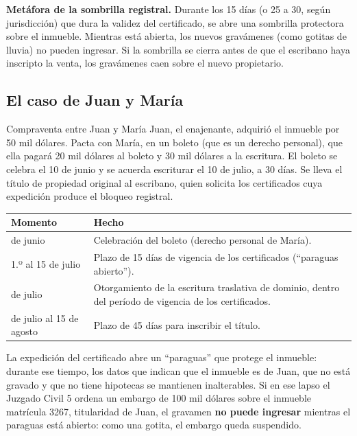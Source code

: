 \documentclass[12pt,oneside]{book}
\begin{document}
\begin{note}
\textbf{Metáfora de la sombrilla registral.} Durante los 15 días (o 25 a 30, según jurisdicción) que dura la validez del certificado, se abre una sombrilla protectora sobre el inmueble. Mientras está abierta, los nuevos gravámenes (como gotitas de lluvia) no pueden ingresar. Si la sombrilla se cierra antes de que el escribano haya inscripto la venta, los gravámenes caen sobre el nuevo propietario.
\end{note}

\subsection{El caso de Juan y María}

\begin{example}{Compraventa entre Juan y María}
Juan, el enajenante, adquirió el inmueble por 50 mil dólares. Pacta con María, en un boleto (que es un derecho personal), que ella pagará 20 mil dólares al boleto y 30 mil dólares a la escritura. El boleto se celebra el 10 de junio y se acuerda escriturar el 10 de julio, a 30 días. Se lleva el título de propiedad original al escribano, quien solicita los certificados cuya expedición produce el bloqueo registral.
\end{example}

\begin{table}[H]
\centering
\begin{tabularx}{\textwidth}{@{}>{\raggedright\arraybackslash}p{}>{\raggedright\arraybackslash}X@{}}
\toprule
\textbf{Momento} & \textbf{Hecho} \\
\midrule
10 de junio & Celebración del boleto (derecho personal de María). \\
1.º al 15 de julio & Plazo de 15 días de vigencia de los certificados (``paraguas abierto''). \\
10 de julio & Otorgamiento de la escritura traslativa de dominio, dentro del período de vigencia de los certificados. \\
10 de julio al 15 de agosto & Plazo de 45 días para inscribir el título. \\
\bottomrule
\end{tabularx}
\end{table}

La expedición del certificado abre un ``paraguas'' que protege el inmueble: durante ese tiempo, los datos que indican que el inmueble es de Juan, que no está gravado y que no tiene hipotecas se mantienen inalterables. Si en ese lapso el Juzgado Civil 5 ordena un embargo de 100 mil dólares sobre el inmueble matrícula 3267, titularidad de Juan, el gravamen \textbf{no puede ingresar} mientras el paraguas está abierto: como una gotita, el embargo queda suspendido.
\end{document}
